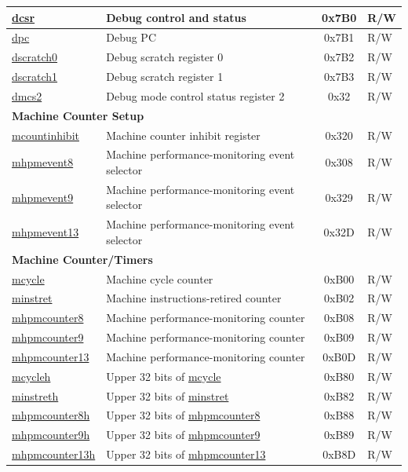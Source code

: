\begin{longtable}{ | p{4.0cm} | p{8.4cm} | c | l | }
\hyperref[regdesc:DCSR]{dcsr} & Debug control and status  & 0x7B0 & R/W \\\hline
\hyperref[regdesc:DPC]{dpc} & Debug PC & 0x7B1 & R/W \\\hline
\hyperref[regdesc:DSCRATCH0]{dscratch0} & Debug scratch register 0 & 0x7B2 & R/W \\\hline
\hyperref[regdesc:DSCRATCH1]{dscratch1} & Debug scratch register 1 & 0x7B3 & R/W \\\hline
\hyperref[regdesc:dmcs2]{dmcs2} & Debug mode control status register 2 & 0x32 & R/W \\\hline
\multicolumn{4}{|l|}{\textbf{Machine Counter Setup }} \\\hline
\hyperref[regdesc:MCOUNTINHIBIT]{mcountinhibit} & Machine counter inhibit register & 0x320 & R/W \\\hline
\hyperref[regdesc:MHPMEVENT8]{mhpmevent8} & Machine performance-monitoring event selector & 0x308 & R/W \\\hline
\hyperref[regdesc:MHPMEVENT9]{mhpmevent9} & Machine performance-monitoring event selector & 0x329& R/W \\\hline
\hyperref[regdesc:MHPMEVENT13]{mhpmevent13} & Machine performance-monitoring event selector & 0x32D & R/W \\\hline


\multicolumn{4}{|l|}{\textbf{Machine Counter/Timers}} \\\hline
\hyperref[regdesc:MCYCLE]{mcycle} & Machine cycle counter & 0xB00 & R/W \\\hline
\hyperref[regdesc:MINSTRET]{minstret} & Machine instructions-retired counter & 0xB02 & R/W \\\hline
\hyperref[regdesc:MHPMCOUNTER8]{mhpmcounter8} & Machine performance-monitoring counter & 0xB08 & R/W \\\hline
\hyperref[regdesc:MHPMCOUNTER9]{mhpmcounter9} & Machine performance-monitoring counter & 0xB09 & R/W \\\hline
\hyperref[regdesc:MHPMCOUNTER13]{mhpmcounter13} & Machine performance-monitoring counter & 0xB0D & R/W \\\hline
\hyperref[regdesc:MCYCLEH]{mcycleh} & Upper 32 bits of \hyperref[regdesc:MCYCLE]{mcycle} & 0xB80 & R/W \\\hline
\hyperref[regdesc:MINSTRETH]{minstreth} & Upper 32 bits of \hyperref[regdesc:MINSTRET]{minstret}  & 0xB82 & R/W \\\hline
\hyperref[regdesc:MHPMCOUNTER8H]{mhpmcounter8h} & Upper 32 bits of \hyperref[regdesc:MHPMCOUNTER8]{mhpmcounter8} & 0xB88 & R/W \\\hline
\hyperref[regdesc:MHPMCOUNTER9H]{mhpmcounter9h} & Upper 32 bits of \hyperref[regdesc:MHPMCOUNTER9]{mhpmcounter9} & 0xB89 & R/W \\\hline
\hyperref[regdesc:MHPMCOUNTER13H]{mhpmcounter13h} & Upper 32 bits of \hyperref[regdesc:MHPMCOUNTER13]{mhpmcounter13} & 0xB8D & R/W \\\hline


\end{longtable}
